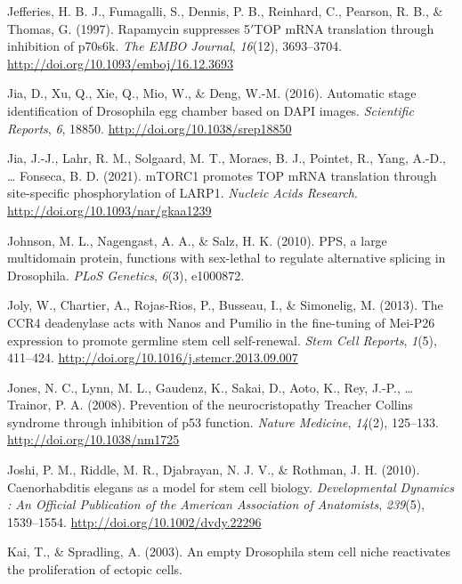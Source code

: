 \documentclass[12pt,oneside]{reedthesis}
\newlength{\cslhangindent}
\newenvironment{cslreferences}%
  {\setlength{\parindent}{0pt}%
  \everypar{\setlength{\hangindent}{\cslhangindent}}\ignorespaces}%
  {\par}
\begin{document}
\begin{cslreferences}
\leavevmode\hypertarget{ref-jefferiesRapamycinSuppressesTOP1997}{}%
Jefferies, H. B. J., Fumagalli, S., Dennis, P. B., Reinhard, C., Pearson, R. B., \& Thomas, G. (1997). Rapamycin suppresses 5\({'}\)TOP mRNA translation through inhibition of p70s6k. \emph{The EMBO Journal}, \emph{16}(12), 3693--3704. \url{http://doi.org/10.1093/emboj/16.12.3693}

\leavevmode\hypertarget{ref-Jia2016b}{}%
Jia, D., Xu, Q., Xie, Q., Mio, W., \& Deng, W.-M. (2016). Automatic stage identification of Drosophila egg chamber based on DAPI images. \emph{Scientific Reports}, \emph{6}, 18850. \url{http://doi.org/10.1038/srep18850}

\leavevmode\hypertarget{ref-jiaMTORC1PromotesTOP2021}{}%
Jia, J.-J., Lahr, R. M., Solgaard, M. T., Moraes, B. J., Pointet, R., Yang, A.-D., \ldots{} Fonseca, B. D. (2021). mTORC1 promotes TOP mRNA translation through site-specific phosphorylation of LARP1. \emph{Nucleic Acids Research}. \url{http://doi.org/10.1093/nar/gkaa1239}

\leavevmode\hypertarget{ref-Johnson2010}{}%
Johnson, M. L., Nagengast, A. A., \& Salz, H. K. (2010). PPS, a large multidomain protein, functions with sex-lethal to regulate alternative splicing in Drosophila. \emph{PLoS Genetics}, \emph{6}(3), e1000872.

\leavevmode\hypertarget{ref-Joly2013f}{}%
Joly, W., Chartier, A., Rojas-Rios, P., Busseau, I., \& Simonelig, M. (2013). The CCR4 deadenylase acts with Nanos and Pumilio in the fine-tuning of Mei-P26 expression to promote germline stem cell self-renewal. \emph{Stem Cell Reports}, \emph{1}(5), 411--424. \url{http://doi.org/10.1016/j.stemcr.2013.09.007}

\leavevmode\hypertarget{ref-jonesPreventionNeurocristopathyTreacher2008}{}%
Jones, N. C., Lynn, M. L., Gaudenz, K., Sakai, D., Aoto, K., Rey, J.-P., \ldots{} Trainor, P. A. (2008). Prevention of the neurocristopathy Treacher Collins syndrome through inhibition of p53 function. \emph{Nature Medicine}, \emph{14}(2), 125--133. \url{http://doi.org/10.1038/nm1725}

\leavevmode\hypertarget{ref-Joshi2010l}{}%
Joshi, P. M., Riddle, M. R., Djabrayan, N. J. V., \& Rothman, J. H. (2010). Caenorhabditis elegans as a model for stem cell biology. \emph{Developmental Dynamics : An Official Publication of the American Association of Anatomists}, \emph{239}(5), 1539--1554. \url{http://doi.org/10.1002/dvdy.22296}

\leavevmode\hypertarget{ref-kaiEmptyDrosophilaStem2003}{}%
Kai, T., \& Spradling, A. (2003). An empty Drosophila stem cell niche reactivates the proliferation of ectopic cells.


\end{cslreferences}
\end{document}

